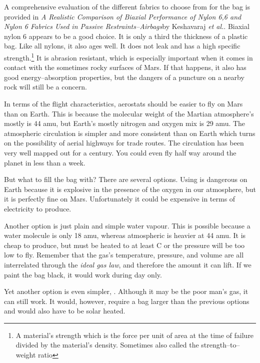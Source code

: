 A comprehensive evaluation of the different fabrics to choose from for the bag is provided in {\it A Realistic Comparison of Biaxial Performance of Nylon 6,6 and Nylon 6 Fabrics Used in Passive Restraints--Airbags}\footnotecite[keshavaraj1996] by Keshavaraj {\it et al.}. Biaxial nylon 6 appears to be a good choice. It is only a third the thickness of a plastic bag. Like all nylons, it also ages well. It does not leak and has a high specific strength.\footnote{A material's strength which is the force per unit of area at the time of failure divided by the material's density. Sometimes also called the strength--to--weight ratio} It is abrasion resistant, which is especially important when it comes in contact with the sometimes rocky surfaces of Mars. If that happens, it also has good energy--absorption properties, but the dangers of a puncture on a nearby rock will still be a concern.

In terms of the flight characteristics, aerostats should be easier to fly on Mars than on Earth. This is because the molecular weight of the Martian atmosphere's mostly  is 44 amu, but Earth's mostly nitrogen and oxygen mix is 29 amu. The atmospheric circulation is simpler and more consistent than on Earth which turns on the possibility of aerial highways for trade routes. The circulation has been very well mapped out for a century. You could even fly half way around the planet in less than a week.

But what to fill the bag with? There are several options. Using  is dangerous on Earth because it is explosive in the presence of the oxygen in our atmosphere, but it is perfectly fine on Mars. Unfortunately it could be expensive in terms of electricity to produce. 

Another option is just plain and simple  water vapour. This is possible because a water molecule is only 18 amu, whereas atmospheric  is heavier at 44 amu. It is cheap to produce, but must be heated to at least C or the pressure will be too low to fly. Remember that the gas's temperature, pressure, and volume are all interrelated through the {\it ideal gas law}, and therefore the amount it can lift. If we paint the bag black, it would work during day only. 

Yet another option is even simpler, . Although it may be the poor man's gas, it can still work. It would, however, require a bag larger than the previous options and would also have to be solar heated.

